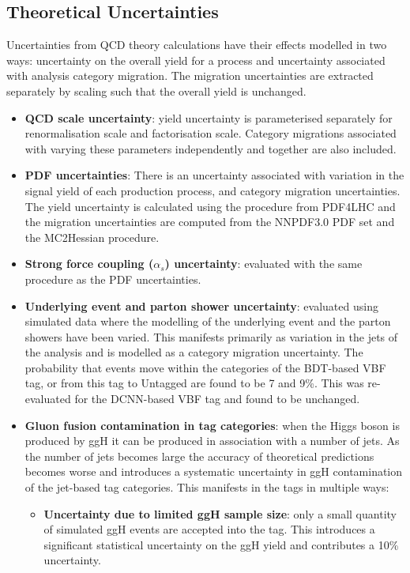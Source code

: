 \subsection{Theoretical Uncertainties}
Uncertainties from QCD theory calculations have their effects modelled in two ways: uncertainty on the overall yield for a process and uncertainty associated with analysis category migration. 
The migration uncertainties are extracted separately by scaling such that the overall yield is unchanged.  
\begin{itemize}[noitemsep]
    \item {\textbf{QCD scale uncertainty}: yield uncertainty is parameterised separately for renormalisation scale and factorisation scale. 
                                            Category migrations associated with varying these parameters independently and together are also included.}
    \item{\textbf{PDF uncertainties}: There is an uncertainty associated with variation in the signal yield of each production process, and category migration uncertainties.   
        The yield uncertainty is calculated using the procedure from PDF4LHC \cite{PDF4LHC} and the migration uncertainties are computed from the NNPDF3.0 PDF set \cite{NNPDF3} and the MC2Hessian \cite{MC2Hessian} procedure.}
    \item{\textbf{Strong force coupling ($\alpha_{s}$) uncertainty}: evaluated with the same procedure as the PDF uncertainties.}
    \item{\textbf{Underlying event and parton shower uncertainty}: evaluated using simulated data where the modelling of the underlying event and the parton showers have been varied. This manifests primarily as variation in the jets of the analysis and is modelled as a category migration uncertainty. The probability that events move within the categories of the BDT-based VBF tag, or from this tag to Untagged are found to be 7 and 9\%. This was re-evaluated for the DCNN-based VBF tag and found to be unchanged.}
    \item{\textbf{Gluon fusion contamination in \ttH tag categories}: when the Higgs boson is produced by ggH it can be produced in association with a number of jets. As the number of jets becomes large the accuracy of theoretical predictions becomes worse and introduces a systematic uncertainty in ggH contamination of the jet-based tag categories. This manifests in the \ttH tags in multiple ways:
        \begin{itemize}[noitemsep]
            \item[\textbullet] \textbf{Uncertainty due to limited ggH sample size}: only a small quantity of simulated ggH events are accepted into the \ttH tag. This introduces a significant statistical uncertainty on the ggH yield and contributes a 10\% uncertainty.

\end{itemize}}
\end{itemize}

